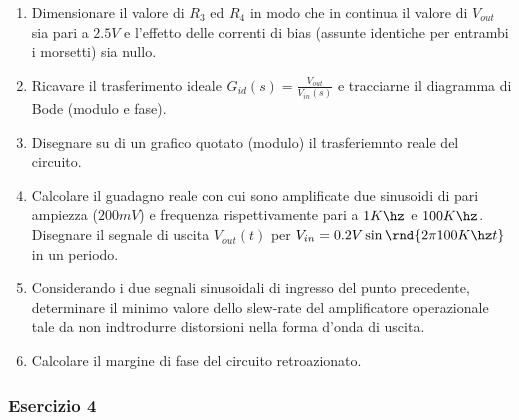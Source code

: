 \documentclass[\main/main.tex]{subfiles}
\begin{document}
\begin{enumerate}
\item Dimensionare il valore di $R_3$ ed $R_4$ in modo che in continua il valore di $V_{out}$ sia pari a $2.5V$ e l'effetto delle correnti di bias (assunte identiche per entrambi i morsetti) sia nullo.
\item Ricavare il trasferimento ideale $G_{id}(s) = \frac{V_{out}}{V_{in}(s)}$ e tracciarne il diagramma di Bode (modulo e fase).
\item Disegnare su di un grafico quotato (modulo) il trasferiemnto reale del circuito.
\item Calcolare il guadagno reale con cui sono amplificate due sinusoidi di pari ampiezza ($200mV$) e frequenza rispettivamente pari a $1K\hz$ e $100K\hz$. Disegnare il segnale di uscita $V_{out}(t)$ per $V_{in} = 0.2V \sin{\rnd{2\pi 100K\hz t}}$ in un periodo.
\item Considerando i due segnali sinusoidali di ingresso del punto precedente, determinare il minimo valore dello slew-rate del amplificatore operazionale tale da non indtrodurre distorsioni nella forma d'onda di uscita.
\item Calcolare il margine di fase del circuito retroazionato.
\end{enumerate}

\clearpage
\subsubsection{Esercizio 4}
\end{document}
